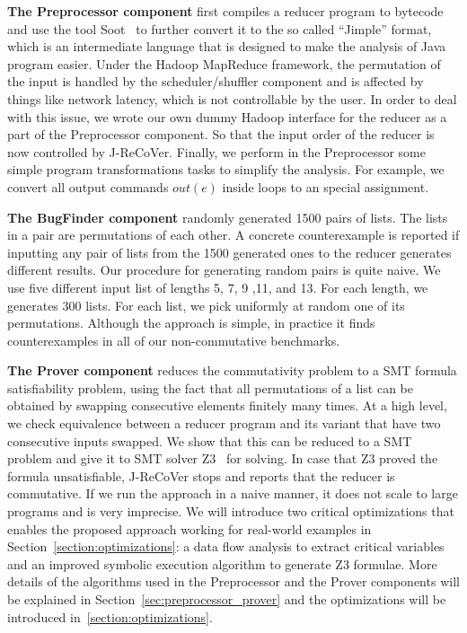 \documentclass{llncs}
\begin{document}
\textbf{The Preprocessor component} first compiles a reducer program to bytecode and use the tool Soot~\cite{soot} to further convert it to the so called ``Jimple'' format, which is an intermediate language that is designed to make the analysis of Java program easier. Under the Hadoop MapReduce framework, the permutation of the input is handled by the scheduler/shuffler component and is affected by things like network latency, which is not controllable by the user. In order to deal with this issue, we wrote our own dummy Hadoop interface for the reducer as a part of the Preprocessor component. So that the input order of the reducer is now controlled by J-ReCoVer. Finally, we perform in the Preprocessor some simple program transformations tasks to simplify the analysis. For example, we convert all output commands $out(e)$ inside loops to an special assignment.

\textbf{The BugFinder component} randomly generated 1500 pairs of lists. The lists in a pair are permutations of each other. A concrete counterexample is reported if inputting any pair of lists from the 1500 generated ones to the reducer generates different results.
Our procedure for generating random pairs is quite naive. We use five different input list of lengths 5, 7, 9 ,11, and 13. For each length, we generates 300 lists. For each list, we pick uniformly at random one of its permutations. Although the approach is simple, in practice it finds counterexamples in all of our non-commutative benchmarks.

\textbf{The Prover component} reduces the commutativity problem to a SMT formula satisfiability problem, using the fact that all permutations of a list can be obtained by swapping consecutive elements finitely many times. At a high level, we check equivalence between a reducer program and its variant that have two consecutive inputs swapped. We show that this can be reduced to a SMT problem and give it to SMT solver Z3~\cite{z3} for solving. In case that Z3 proved the formula unsatisfiable, J-ReCoVer stops and reports that the reducer is commutative.
If we run the approach in a naive manner, it does not scale to large programs and is very imprecise.  We will introduce two critical optimizations that enables the proposed approach working for real-world examples in Section~\ref{section:optimizations}: a data flow analysis to extract critical variables and an improved symbolic execution algorithm to generate Z3 formulae. More details of the algorithms used in the Preprocessor and the Prover components will be explained in Section~\ref{sec:preprocessor_prover} and the optimizations will be introduced in~\ref{section:optimizations}.
\end{document}

